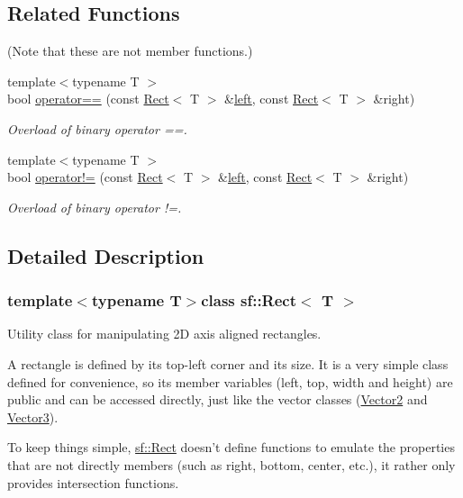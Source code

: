 \subsection*{Related Functions}
(Note that these are not member functions.) \begin{DoxyCompactItemize}
\item 
{\footnotesize template$<$typename T $>$ }\\bool \hyperlink{classsf_1_1Rect_ab3488b5dbd0e587c4d7cb80605affc46}{operator==} (const \hyperlink{classsf_1_1Rect}{Rect}$<$ T $>$ \&\hyperlink{classsf_1_1Rect_aa49960fa465103d9cb7069ceb25c7c32}{left}, const \hyperlink{classsf_1_1Rect}{Rect}$<$ T $>$ \&right)
\begin{DoxyCompactList}\small\item\em Overload of binary operator ==. \end{DoxyCompactList}\item 
{\footnotesize template$<$typename T $>$ }\\bool \hyperlink{classsf_1_1Rect_a03fc4c105687b7d0f07b6b4ed4b45581}{operator!=} (const \hyperlink{classsf_1_1Rect}{Rect}$<$ T $>$ \&\hyperlink{classsf_1_1Rect_aa49960fa465103d9cb7069ceb25c7c32}{left}, const \hyperlink{classsf_1_1Rect}{Rect}$<$ T $>$ \&right)
\begin{DoxyCompactList}\small\item\em Overload of binary operator !=. \end{DoxyCompactList}\end{DoxyCompactItemize}


\subsection{Detailed Description}
\subsubsection*{template$<$typename T$>$class sf\-::\-Rect$<$ T $>$}

Utility class for manipulating 2\-D axis aligned rectangles. 

A rectangle is defined by its top-\/left corner and its size. It is a very simple class defined for convenience, so its member variables (left, top, width and height) are public and can be accessed directly, just like the vector classes (\hyperlink{classsf_1_1Vector2}{Vector2} and \hyperlink{classsf_1_1Vector3}{Vector3}).

To keep things simple, \hyperlink{classsf_1_1Rect}{sf\-::\-Rect} doesn't define functions to emulate the properties that are not directly members (such as right, bottom, center, etc.), it rather only provides intersection functions.

